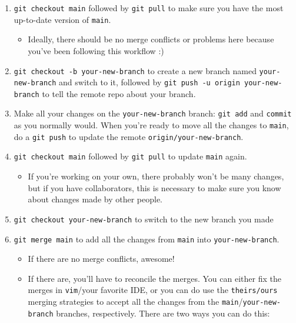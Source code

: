 \documentclass[
]{article}
\providecommand{\tightlist}{%
  \setlength{\itemsep}{0pt}\setlength{\parskip}{0pt}}
\begin{document}
\begin{enumerate}
\def\labelenumi{\arabic{enumi}.}
\tightlist
\item
  \texttt{git\ checkout\ main} followed by \texttt{git\ pull} to make
  sure you have the most up-to-date version of \texttt{main}.

  \begin{itemize}
  \tightlist
  \item
    Ideally, there should be no merge conflicts or problems here because
    you've been following this workflow :)
  \end{itemize}
\item
  \texttt{git\ checkout\ -b\ your-new-branch} to create a new branch
  named \texttt{your-new-branch} and switch to it, followed by
  \texttt{git\ push\ -u\ origin\ your-new-branch} to tell the remote
  repo about your branch.
\item
  Make all your changes on the \texttt{your-new-branch} branch:
  \texttt{git\ add} and \texttt{commit} as you normally would. When
  you're ready to move all the changes to \texttt{main}, do a
  \texttt{git\ push} to update the remote
  \texttt{origin/your-new-branch}.
\item
  \texttt{git\ checkout\ main} followed by \texttt{git\ pull} to update
  \texttt{main} again.

  \begin{itemize}
  \tightlist
  \item
    If you're working on your own, there probably won't be many changes,
    but if you have collaborators, this is necessary to make sure you
    know about changes made by other people.
  \end{itemize}
\item
  \texttt{git\ checkout\ your-new-branch} to switch to the new branch
  you made
\item
  \texttt{git\ merge\ main} to add all the changes from \texttt{main}
  into \texttt{your-new-branch}.

  \begin{itemize}
  \tightlist
  \item
    If there are no merge conflicts, awesome!
  \item
    If there are, you'll have to reconcile the merges. You can either
    fix the merges in \texttt{vim}/your favorite IDE, or you can do use
    the \texttt{theirs/ours} merging strategies to accept all the
    changes from the \texttt{main}/\texttt{your-new-branch} branches,
    respectively. There are two ways you can do this:


\end{itemize}
\end{enumerate}
\end{document}
